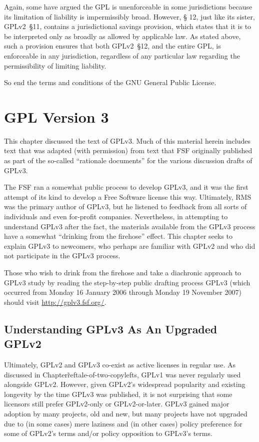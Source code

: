 Again, some have argued the GPL is unenforceable in some jurisdictions
because its limitation of liability is impermissibly broad. However, \S
12, just like its sister, GPLv2~\S11, contains a jurisdictional savings
provision, which states that it is to be interpreted only as broadly as
allowed by applicable law.  As stated above, such a provision ensures that
both GPLv2~\S12, and the entire GPL, is enforceable in any jurisdiction,
regardless of any particular law regarding the permissibility of limiting
liability.

So end the terms and conditions of the GNU General Public License.

\chapter{GPL Version 3}
\label{GPLv3}

This chapter discussed the text of GPLv3.  Much of this material herein
includes text that was adapted (with permission) from text that FSF
originally published as part of the so-called ``rationale documents'' for the
various discussion drafts of GPLv3.

The FSF ran a somewhat public process to develop GPLv3, and it was the first
attempt of its kind to develop a Free Software license this way.  Ultimately,
RMS was the primary author of GPLv3, but he listened to feedback from all
sorts of individuals and even for-profit companies.  Nevertheless, in
attempting to understand GPLv3 after the fact, the materials available from
the GPLv3 process have a somewhat ``drinking from the firehose'' effect.
This chapter seeks to explain GPLv3 to newcomers, who perhaps are familiar
with GPLv2 and who did not participate in the GPLv3 process.

Those who wish to drink from the firehose and take a diachronic approach to
GPLv3 study by reading the step-by-step public drafting process GPLv3 (which
occurred from Monday 16 January 2006 through Monday 19 November 2007) should
visit \url{http://gplv3.fsf.org/}.

\section{Understanding GPLv3 As An Upgraded GPLv2}

Ultimately, GPLv2 and GPLv3 co-exist as active licenses in regular use.  As
discussed in Chapter\~ref{tale-of-two-copylefts}, GPLv1 was never regularly
used alongside GPLv2.  However, given GPLv2's widespread popularity and
existing longevity by the time GPLv3 was published, it is not surprising that
some licensors still prefer GPLv2-only or GPLv2-or-later.  GPLv3 gained major
adoption by many projects, old and new, but many projects have not upgraded
due to (in some cases) mere laziness and (in other cases) policy preference
for some of GPLv2's terms and/or policy opposition to GPLv3's terms.

